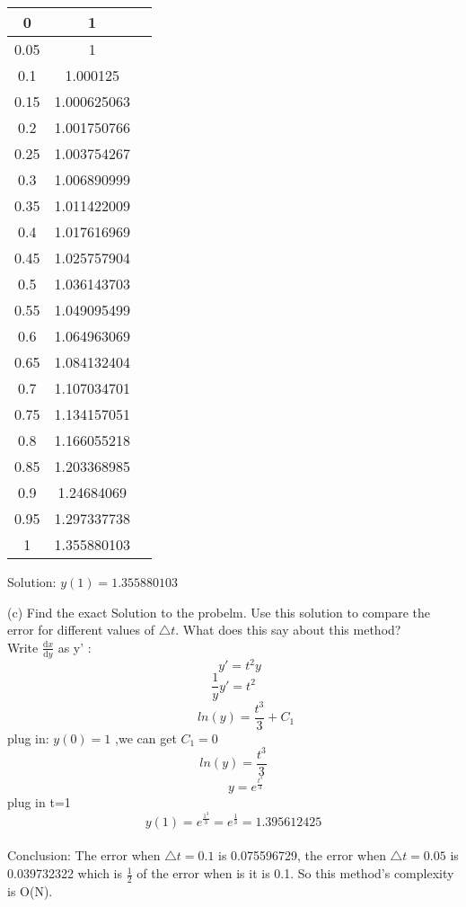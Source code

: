 \documentclass[12pt]{article}
\begin{document}
\begin{center}
		\begin{tabular}{ |c|c|c| } 
			\hline
			0 & 1 \\ \hline
			0.05 & 1 \\ \hline
			0.1 & 1.000125 \\ \hline
			0.15 & 1.000625063 \\ \hline
			0.2 & 1.001750766 \\ \hline
			0.25 & 1.003754267 \\ \hline
			0.3 & 1.006890999 \\ \hline
			0.35 & 1.011422009 \\ \hline
			0.4 & 1.017616969 \\ \hline
			0.45 & 1.025757904 \\ \hline
			0.5 & 1.036143703 \\ \hline
			0.55 & 1.049095499 \\ \hline
			0.6 & 1.064963069 \\ \hline
			0.65 & 1.084132404 \\ \hline
			0.7 & 1.107034701 \\ \hline
			0.75 & 1.134157051 \\ \hline
			0.8 & 1.166055218 \\ \hline
			0.85 & 1.203368985 \\ \hline
			0.9 & 1.24684069 \\ \hline
			0.95 & 1.297337738 \\ \hline
			1 & 1.355880103 \\ \hline
		\end{tabular}
\end{center}
Solution: $y(1)=1.355880103$
\pagebreak


(c) Find the exact Solution to the probelm. Use this solution to compare the error for different values of $\triangle t$. What does this say about this method? \\
Write $\frac{\text{d}x}{\text{d}y}$ as y' : \\
\[ \quad y'=t^2y\]
\[\frac{1}{y}y'=t^2\]
\[\quad \quad ln(y)=\frac{t^3}{3}+C_{1}\]
plug in:  $y(0)=1$
,we can get $C_{1}=0$
\[ln(y)=\frac{t^3}{3}\]
\[\quad \quad y=e^{\frac{t^3}{3}}\]
plug in t=1
\[y(1)=e^{\frac{1^3}{3}}=e^{\frac{1}{3}}=1.395612425\]\\
Conclusion: The error when $ \triangle t=0.1 $ is 0.075596729, the error when $\triangle t = 0.05 $ is 0.039732322 which is $\frac{1}{2}$ of the error when is it is 0.1. So this method's complexity is O(N).
\end{document}

